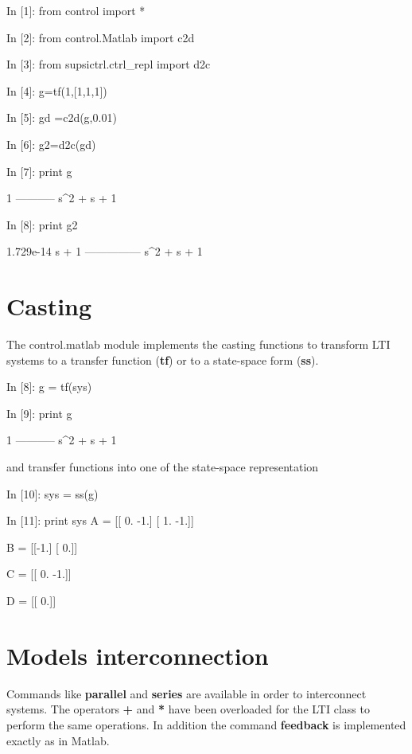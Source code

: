 \begin{code}
In [1]: from control import *

In [2]: from control.Matlab import c2d

In [3]: from supsictrl.ctrl_repl import d2c

In [4]: g=tf(1,[1,1,1])

In [5]: gd =c2d(g,0.01)

In [6]: g2=d2c(gd)

In [7]: print g

     1
-----------
s^2 + s + 1


In [8]: print g2

1.729e-14 s + 1
---------------
  s^2 + s + 1
\end{code}

\section{Casting}
The control.matlab module implements the casting functions to transform LTI 
systems to a transfer function (\textbf{tf}) or to a state-space form 
(\textbf{ss}).

\begin{code}
In [8]: g = tf(sys)

In [9]: print g

     1
-----------
s^2 + s + 1

\end{code}

and transfer functions into one of the  state-space representation

\begin{code}
In [10]: sys = ss(g)

In [11]: print sys
A = [[ 0. -1.]
 [ 1. -1.]]

B = [[-1.]
 [ 0.]]

C = [[ 0. -1.]]

D = [[ 0.]]

\end{code}
\section{Models interconnection}

Commands like \textbf{parallel} and \textbf{series} are available in order to 
interconnect systems. The operators \textbf{+} and \textbf{*} have been 
overloaded for the LTI class to perform the same operations. In addition the 
command \textbf{feedback} is implemented exactly as in Matlab.

